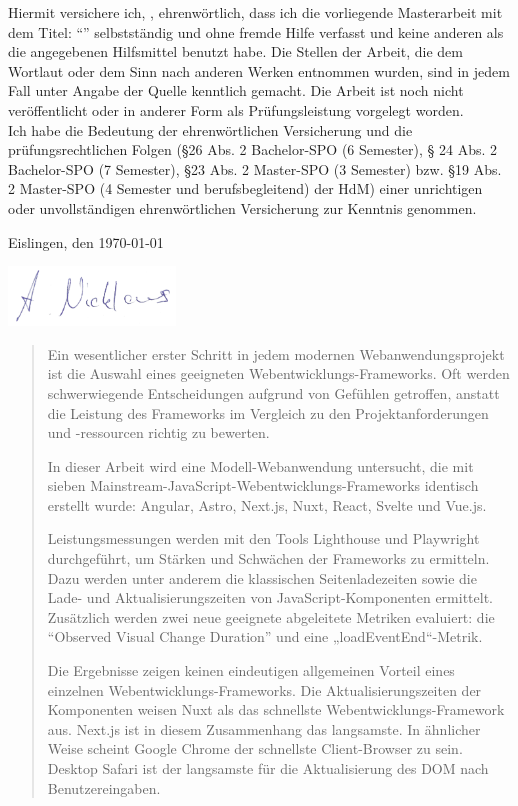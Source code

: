 \documentclass[a4paper, 12pt]{article}
\makeatletter
\let\Title\@title
\let\Author\@author
\makeatother
\begin{document}
	Hiermit versichere ich, \Author, ehrenwörtlich, dass ich die vorliegende Masterarbeit mit dem Titel: \enquote{\Title} selbstständig und ohne fremde Hilfe verfasst und keine anderen als die angegebenen Hilfsmittel benutzt habe.
  Die Stellen der Arbeit, die dem Wortlaut oder dem Sinn nach anderen Werken entnommen wurden, sind in jedem Fall unter Angabe der Quelle kenntlich gemacht.
  Die Arbeit ist noch nicht veröffentlicht oder in anderer Form als Prüfungsleistung vorgelegt worden.\\
	
	Ich habe die Bedeutung der ehrenwörtlichen Versicherung und die prüfungsrechtlichen Folgen (§26 Abs. 2 Bachelor-SPO (6 Semester), § 24 Abs. 2 Bachelor-SPO (7 Semester), §23 Abs. 2 Master-SPO (3 Semester) bzw. §19 Abs. 2 Master-SPO (4 Semester und berufsbegleitend) der HdM) einer unrichtigen oder unvollständigen ehrenwörtlichen Versicherung zur Kenntnis genommen.
	\vspace{30px}
	
	Eislingen, den \today
	\vspace{20px}
	
	\includegraphics[height=60px]{img/unterschrift.png}
	\vspace{10px}
	
	\Author

\pagebreak

\begin{abstract}
  Ein wesentlicher erster Schritt in jedem modernen Webanwendungsprojekt ist die Auswahl eines geeigneten Webentwicklungs-Frameworks.
  Oft werden schwerwiegende Entscheidungen aufgrund von Gefühlen getroffen, anstatt die Leistung des Frameworks im Vergleich zu den Projektanforderungen und -ressourcen richtig zu bewerten.

  In dieser Arbeit wird eine Modell-Webanwendung untersucht, die mit sieben Mainstream-JavaScript-Webentwicklungs-Frameworks identisch erstellt wurde: Angular, Astro, Next.js, Nuxt, React, Svelte und Vue.js.

  Leistungsmessungen werden mit den Tools Lighthouse und Playwright durchgeführt, um Stärken und Schwächen der Frameworks zu ermitteln.
  Dazu werden unter anderem die klassischen Seitenladezeiten sowie die Lade- und Aktualisierungszeiten von JavaScript-Komponenten ermittelt.
  Zusätzlich werden zwei neue geeignete abgeleitete Metriken evaluiert: die \enquote{Observed Visual Change Duration} und eine „loadEventEnd“-Metrik.

  Die Ergebnisse zeigen keinen eindeutigen allgemeinen Vorteil eines einzelnen Webentwicklungs-Frameworks.
  Die Aktualisierungszeiten der Komponenten weisen Nuxt als das schnellste Webentwicklungs-Framework aus.
  Next.js ist in diesem Zusammenhang das langsamste.
  In ähnlicher Weise scheint Google Chrome der schnellste Client-Browser zu sein.
  Desktop Safari ist der langsamste für die Aktualisierung des DOM nach Benutzereingaben.
\end{abstract}
\end{document}
